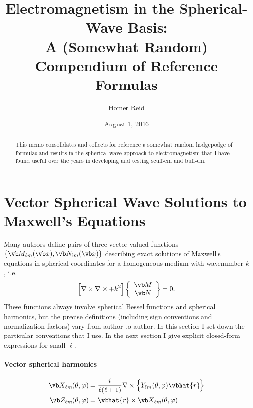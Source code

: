 \documentclass[letterpaper]{article}
\title {Electromagnetism in the Spherical-Wave Basis: \\
        {\large A (Somewhat Random) Compendium of Reference Formulas}
       }
\author {Homer Reid}
\date {August 1, 2016}
\newcommand{\lm}{_{\ell m}}
\begin{document}
\pagestyle{myheadings}
\maketitle

\begin{abstract}
This memo consolidates and collects for reference
a somewhat random hodgepodge of formulas and results
in the spherical-wave approach to electromagnetism
that I have found useful over the years in developing
and testing {\sc scuff-em} and {\sc buff-em}.
\end{abstract}

\tableofcontents

\newpage
\section{Vector Spherical Wave Solutions to Maxwell's Equations}
\label{SphericalMaxwellAppendix}

Many authors define pairs of three-vector-valued functions
$\{\vb M_{\ell m}(\vb x), \vb N_{\ell m}(\vb x)\}$
describing exact solutions of Maxwell's equations 
in spherical coordinates for 
a homogeneous medium with wavenumber $k$, i.e.
$$\Big[\nabla \times \nabla \times + k^2 \Big]
  \left\{\begin{array}{c} \vb M \\ \vb N\end{array}\right\} = 0.$$
These functions always involve spherical Bessel functions and
spherical harmonics, but the precise definitions (including
sign conventions and normalization factors) vary from author
to author. In this section I set down the particular
conventions that I use. In the next section I give
explicit closed-form expressions for small $\ell$.

\paragraph{Vector spherical harmonics}
\begin{align*}
  \vb X\lm(\theta, \varphi) 
&= \frac{i}{\ell(\ell+1)}\nabla \times 
     \Big\{Y\lm(\theta, \varphi) \vbhat{r}\Big\}
\\
  \vb Z\lm(\theta, \varphi) &= \vbhat{r} \times \vb X\lm(\theta, \varphi)
\end{align*}
\end{document}
